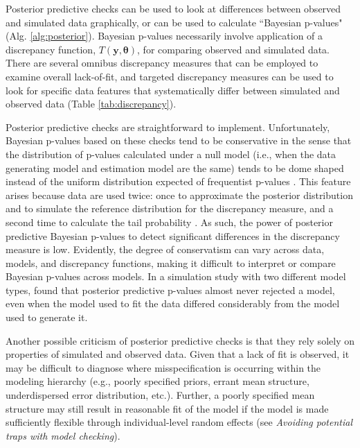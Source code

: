 \documentclass[12pt,english]{article}
\begin{document}
\begin{spacing}{1.9}
Posterior predictive checks can be used to look at differences between observed and simulated data graphically, or can be used to calculate ``Bayesian p-values" (Alg. \ref{alg:posterior}).  Bayesian p-values necessarily involve application of a discrepancy function, $T(\textbf{y},\boldsymbol{\theta})$, for comparing observed and simulated data.  There are several omnibus discrepancy measures that can be employed to examine overall lack-of-fit, and targeted discrepancy measures can be used to look for specific data features that systematically differ between simulated and observed data (Table \ref{tab:discrepancy}).

Posterior predictive checks are straightforward to implement.  Unfortunately, Bayesian p-values based on these checks tend to be conservative in the sense that the distribution of p-values calculated under a null model (i.e., when the data generating model and estimation model are the same) tends to be dome shaped instead of the uniform distribution expected of frequentist p-values \citep{RobinsEtAl2000}. This feature arises because data are used twice: once to approximate the posterior distribution and to simulate the reference distribution for the discrepancy measure, and a second time to calculate the tail probability  \citep{BayarriBerger2000}.  As such, the power of posterior predictive Bayesian p-values to detect significant differences in the discrepancy measure is low.  Evidently, the degree of conservatism can vary across data, models, and discrepancy functions, making it difficult to interpret or compare Bayesian p-values across models. In a simulation study with two different model types, \citet{Zhang2014} found that posterior predictive p-values almost never rejected a model, even when the model used to fit the data differed considerably from the model used to generate it.

Another possible criticism of posterior predictive checks is that they rely solely on properties of simulated and observed data.  Given that a lack of fit is observed, it may be difficult to diagnose where misspecification is occurring within the modeling hierarchy (e.g., poorly specified priors, errant mean structure, underdispersed error distribution, etc.).  Further, a poorly specified mean structure may still result in reasonable fit of the model if the model is made sufficiently flexible through individual-level random effects (see \textit{Avoiding potential traps with model checking}).


\end{spacing}
\end{document}
